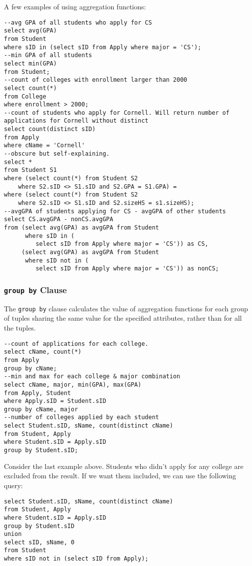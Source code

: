 A few examples of using aggregation functions:
\begin{lstlisting}
--avg GPA of all students who apply for CS
select avg(GPA)
from Student
where sID in (select sID from Apply where major = 'CS');
--min GPA of all students
select min(GPA)
from Student;
--count of colleges with enrollment larger than 2000
select count(*)
from College
where enrollment > 2000;
--count of students who apply for Cornell. Will return number of applications for Cornell without distinct 
select count(distinct sID) 
from Apply
where cName = 'Cornell'
--obscure but self-explaining.
select * 
from Student S1
where (select count(*) from Student S2
    where S2.sID <> S1.sID and S2.GPA = S1.GPA) =
where (select count(*) from Student S2
    where S2.sID <> S1.sID and S2.sizeHS = s1.sizeHS);
--avgGPA of students applying for CS - avgGPA of other students
select CS.avgGPA - nonCS.avgGPA 
from (select avg(GPA) as avgGPA from Student 
      where sID in (
         select sID from Apply where major = 'CS')) as CS, 
     (select avg(GPA) as avgGPA from Student 
      where sID not in (
         select sID from Apply where major = 'CS')) as nonCS;
\end{lstlisting}
\subsubsection{\texttt{group by} Clause}
The \texttt{group by} clause calculates the value of aggregation functions for each group of tuples sharing the same value for the specified attributes, rather than for all the tuples.
\begin{lstlisting}
--count of applications for each college.
select cName, count(*)
from Apply
group by cName;
--min and max for each college & major combination
select cName, major, min(GPA), max(GPA)
from Apply, Student
where Apply.sID = Student.sID
group by cName, major
--number of colleges applied by each student
select Student.sID, sName, count(distinct cName)
from Student, Apply
where Student.sID = Apply.sID
group by Student.sID;
\end{lstlisting}
Consider the last example above. Students who didn't apply for any college are excluded from the result. If we want them included, we can use the following query:
\begin{lstlisting}
select Student.sID, sName, count(distinct cName)
from Student, Apply
where Student.sID = Apply.sID
group by Student.sID
union
select sID, sName, 0
from Student
where sID not in (select sID from Apply);
\end{lstlisting}
